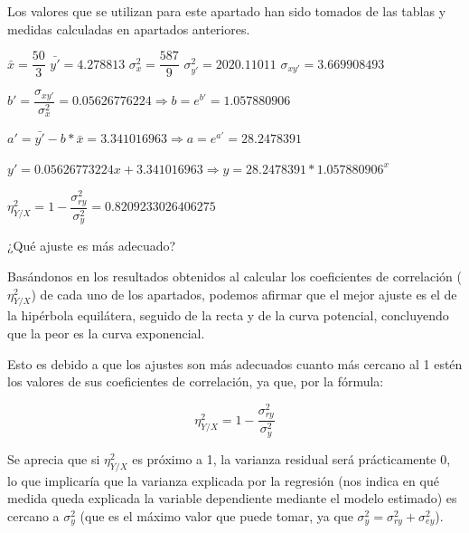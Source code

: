 \documentclass[10pt,a4paper]{article}
\begin{document}
\begin{enumerate}
\vspace{0.25cm}
Los valores que se utilizan para este apartado han sido tomados de las tablas y medidas calculadas en apartados anteriores.

\vspace{0.25cm}
$\bar{x} = \dfrac{50}{3}$ \hspace{1cm} $\bar{y'} = 4.278813$ \hspace{1cm} $\sigma_{x}^2 = \dfrac{587}{9}$ \hspace{1cm} $\sigma_{y'}^2 = 2020.11011$ \hspace{1cm} $\sigma_{xy'} = 3.669908493$

\vspace{0.25cm}
$b' = \dfrac{\sigma_{xy'}}{\sigma_{x}^2} = 0.05626776224 \Rightarrow b = e^{b'} = 1.057880906$

\vspace{0.25cm}
$a' = \bar{y'} - b * \bar{x} = 3.341016963 \Rightarrow a = e^{a'} = 28.2478391$

\begin{center}
$y' = 0.05626773224x + 3.341016963 \Rightarrow y = 28.2478391*1.057880906^x$
\end{center} 

\vspace{0.25cm}
$\eta_{Y / X}^2 = 1 - \dfrac{\sigma_{ry}^2}{\sigma_y^2} = 0.8209233026406275$


\vspace{0.5cm}
\hspace{0.25cm} ¿Qué ajuste es más adecuado?

\vspace{0.25cm}
Basándonos en los resultados obtenidos al calcular los coeficientes de correlación ($\eta_{Y/X}^2$) de cada uno de los apartados, podemos afirmar que el mejor ajuste es el de la hipérbola equilátera, seguido de la recta y de la curva potencial, concluyendo que la peor es la curva exponencial.

Esto es debido a que los ajustes son más adecuados cuanto más cercano al 1 estén los valores de sus coeficientes de correlación, ya que, por la fórmula:

\begin{equation*}
\eta_{Y / X}^2 = 1 - \dfrac{\sigma_{ry}^2}{\sigma_y^2}
\end{equation*}

Se aprecia que si $\eta_{Y/X}^2$ es próximo a 1, la varianza residual será prácticamente 0, lo que implicaría que la varianza explicada por la regresión (nos indica en qué medida queda explicada la variable dependiente mediante el modelo estimado) es cercano a $\sigma_{y}^2$ (que es el máximo valor que puede tomar, ya que $\sigma_{y}^2 = \sigma_{ry}^2 + \sigma_{ey}^2$). 


\end{enumerate}
\end{document}

